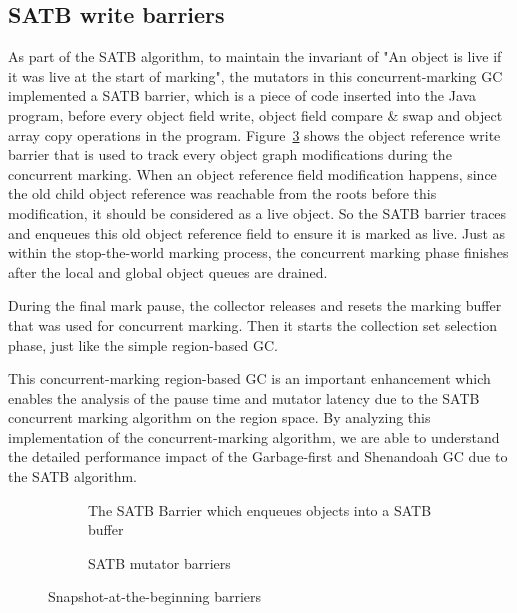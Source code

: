 \subsection{SATB write barriers}

As part of the SATB algorithm, to maintain the invariant of "An object is live if it was live at the start of marking",
the mutators in this concurrent-marking GC implemented a SATB barrier, which is a piece of code
inserted into the Java program, before every object field write, object field compare \& swap
and object array copy operations in the program.
Figure~\ref{fig:satbbarrier} shows the object reference write barrier that is used
to track every object graph modifications during the concurrent marking.
When an object reference field modification happens, since the old child object reference
was reachable from the roots before this modification, it should be considered as a live object.
So the SATB barrier traces and enqueues this old object reference field to ensure it is marked as live.
Just as within the stop-the-world marking process, the concurrent marking phase finishes after
the local and global object queues are drained.

During the final mark pause, the collector releases and resets the marking buffer that
was used for concurrent marking. Then it starts the collection set selection phase, just like the
simple region-based GC.

This concurrent-marking region-based GC is an important enhancement which enables
the analysis of the pause time and mutator latency due to the SATB concurrent marking algorithm on the region space.
By analyzing this implementation of the concurrent-marking algorithm,
we are able to understand the detailed performance impact of the Garbage-first and Shenandoah GC due to the SATB algorithm.

\begin{figure}
  \centering
  \begin{subfigure}[a]{\textwidth}
    
    \caption{The SATB Barrier which enqueues objects into a SATB buffer}
    \label{fig:satb:enqueue}
  \end{subfigure}

  \begin{subfigure}[b]{\textwidth}
    
    \caption{SATB mutator barriers}
    \label{fig:satb:ofw}
  \end{subfigure}

  \caption{Snapshot-at-the-beginning barriers}
  \label{fig:satbbarrier}
\end{figure}


